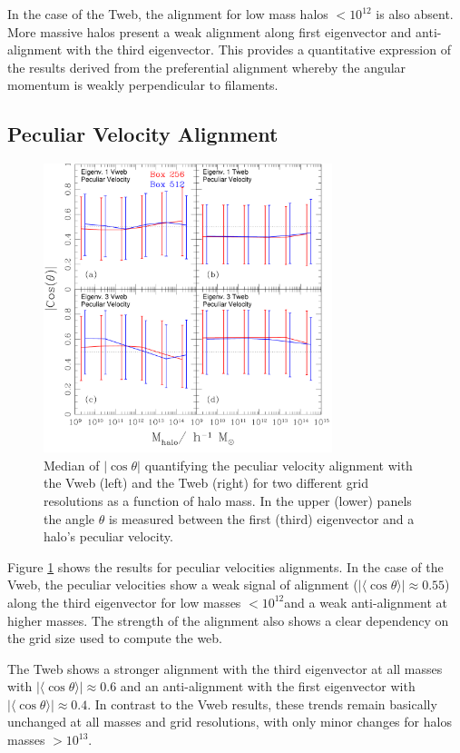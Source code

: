 \documentclass[useAMS,usenatbib]{mn2e}
\newcommand{\hMsun}{{\ifmmode{h^{-1}{\rm
        {M_{\odot}}}}\else{$h^{-1}{\rm{M_{\odot}}}$~}\fi}}
\newcommand{\Msun}{{\ifmmode{{\rm {M_{\odot}}}}\else{${\rm{M_{\odot}}}$}\fi}}
\newcommand{\muavg}{\vert\langle\cos\theta\rangle\vert}
\begin{document}
In the case of the Tweb, the alignment for low mass halos $<10^{12}$\hMsun
is also absent. More massive halos present a weak alignment along
first eigenvector and anti-alignment with the third eigenvector. This
provides a quantitative expression of the results derived from the
preferential alignment whereby the angular momentum is weakly
perpendicular to filaments.

\subsection{Peculiar Velocity Alignment}

\begin{figure}
\includegraphics[width=0.75\textwidth]{Fig4.pdf}
\caption{Median of $\vert\cos\theta\vert$ quantifying the peculiar velocity
  alignment with the Vweb (left) and the Tweb (right) for two different
  grid resolutions as a function of halo mass. In the upper (lower)
  panels the angle $\theta$ is measured between the first (third)
  eigenvector and a halo's peculiar velocity.
\label{fig:velocity_alignment}}
\end{figure}

Figure \ref{fig:velocity_alignment} shows the results for peculiar
velocities alignments. In the case of the Vweb, the peculiar
velocities show a weak signal of alignment ($\muavg\approx0.55$)
along the third eigenvector for low masses $<10^{12}$\Msun and a weak
anti-alignment at higher masses. The strength of the alignment also shows
a clear dependency on the grid size used to compute the web.

The Tweb shows a stronger alignment with the third eigenvector at all
masses with $\muavg\approx0.6$ and an anti-alignment with the first
eigenvector with $\muavg\approx 0.4$. In contrast to the Vweb results,
these trends remain basically unchanged at all masses and grid
resolutions, with only minor changes for halos masses $>10^{13}$\hMsun.
\end{document}
